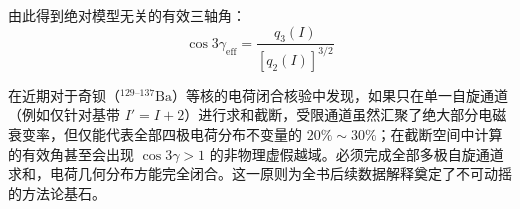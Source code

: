 由此得到绝对模型无关的有效三轴角：
\begin{equation}
    \cos 3\gamma_{\text{eff}} = \frac{q_3(I)}{[q_2(I)]^{3/2}}
\end{equation}

在近期对于奇钡（$^{129\text{--}137}\text{Ba}$）等核的电荷闭合核验中发现，如果只在单一自旋通道（例如仅针对基带 $I'=I+2$）进行求和截断，受限通道虽然汇聚了绝大部分电磁衰变率，但仅能代表全部四极电荷分布不变量的 $20\%\sim 30\%$；在截断空间中计算的有效角甚至会出现 $\cos 3\gamma > 1$ 的非物理虚假越域。必须完成全部多极自旋通道求和，电荷几何分布方能完全闭合。这一原则为全书后续数据解释奠定了不可动摇的方法论基石。
